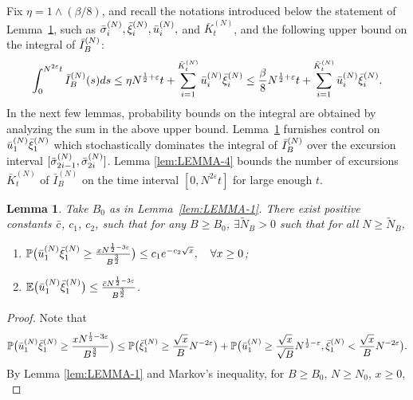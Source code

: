 \documentclass[11pt, reqno]{article}
\newtheorem{lemma}[theorem]{Lemma}
\numberwithin{equation}{section}
\numberwithin{theorem}{section}
\begin{document}
\begin{appendix}
Fix $\eta=1 \wedge (\beta/8)$, and 
recall the notations introduced below the statement of Lemma~\ref{lem:LEMMA-3}, such as $\Bar{\sigma}^{(N)}_{i}, \Bar{\xi}^{(N)}_i, \Bar{u}^{(N)}_i,$ and $\bar{K}^{(N)}_t$, and the following upper bound on the integral of $\Bar{I}_B^{(N)}$:
$$\int_0^{N^{2\varepsilon}t}\Bar{I}_B^{(N)}(s)ds \le \eta N^{\frac{1}{2}+\varepsilon} t+ \sum_{i=1}^{\bar{K}^{(N)}_{t}}\Bar{u}^{(N)}_i\Bar{\xi}^{(N)}_i
    \le \frac{\beta}{8}N^{\frac{1}{2}+\varepsilon}t + \sum_{i=1}^{\bar{K}^{(N)}_{t}}\Bar{u}^{(N)}_i\Bar{\xi}^{(N)}_i.$$
In the next few lemmas, probability bounds on the integral are obtained by analyzing the sum in the above upper bound.
Lemma~\ref{lem:LEMMA-3} furnishes control on $\Bar{u}^{(N)}_1\Bar{\xi}^{(N)}_1$ which stochastically dominates the integral of $\Bar{I}^{(N)}_B$ over the excursion interval $[\Bar{\sigma}^{(N)}_{2i-1}, \Bar{\sigma}^{(N)}_{2i}]$. Lemma \ref{lem:LEMMA-4} bounds the number of excursions $\bar{K}^{(N)}_t$ of $\bar{I}_B^{(N)}$ on the time interval $[0,N^{2\varepsilon}t]$ for large enough $t$.
\begin{lemma}\label{lem:LEMMA-3}
Take $B_0$ as in Lemma~\ref{lem:LEMMA-1}. There exist positive constants $\Bar{c}$, $c_1$, $c_2$, such that
for any $B\geq B_0$, $\exists \tilde N_B>0$ such that for all $N\geq \tilde N_B$,
\begin{enumerate}[\normalfont (i)]
    \item $\mathbb{P}\big(\Bar{u}^{(N)}_1\Bar{\xi}^{(N)}_1\geq \frac{xN^{\frac{1}{2}-3\varepsilon}}{B^{\frac{3}{2}}}\big)\leq c_1e^{-c_2\sqrt{x}},\quad\forall x\geq 0$;
    \item $\mathbb{E}\big(\Bar{u}^{(N)}_1\Bar{\xi}^{(N)}_1\big)\leq \frac{\Bar{c}N^{\frac{1}{2}-3\varepsilon}}{B^{\frac{3}{2}}}$.
\end{enumerate}
\end{lemma}
\begin{proof}%
Note that
\begin{equation}\label{eq:lem4.3-1}
    \mathbb{P}\big(\Bar{u}^{(N)}_1\Bar{\xi}^{(N)}_1\geq \frac{xN^{\frac{1}{2}-3\varepsilon}}{B^{\frac{3}{2}}} \big)\leq \mathbb{P}\big(\Bar{\xi}^{(N)}_1 \geq \frac{\sqrt{x}}{B}N^{-2\varepsilon}\big)+\mathbb{P}\big(\Bar{u}^{(N)}_1\geq \frac{\sqrt{x}}{\sqrt{B}}N^{\frac{1}{2}-\varepsilon},\Bar{\xi}^{(N)}_1 < \frac{\sqrt{x}}{B}N^{-2\varepsilon}\big).
\end{equation}
By Lemma \ref{lem:LEMMA-1} and Markov's inequality, for $B\geq B_0$, $N\geq N_0$, $x \ge 0$,
\begin{equation}\label{eq:lem4.3-2}

\end{equation}
\end{proof}
\end{appendix}
\end{document}
